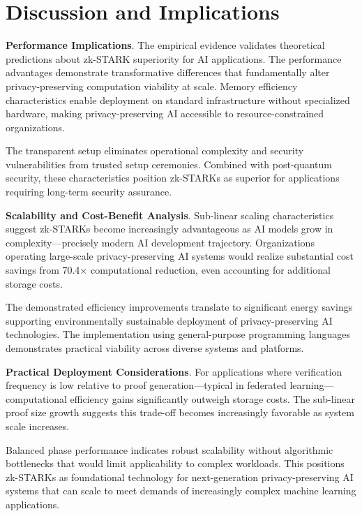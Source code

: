 \documentclass[runningheads]{llncs}
\begin{document}
\section{Discussion and Implications}

{\bf Performance Implications}. The empirical evidence validates theoretical predictions about zk-STARK superiority for AI applications. The performance advantages demonstrate transformative differences that fundamentally alter privacy-preserving computation viability at scale.
Memory efficiency characteristics enable deployment on standard infrastructure without specialized hardware, making privacy-preserving AI accessible to resource-constrained organizations.

The transparent setup eliminates operational complexity and security vulnerabilities from trusted setup ceremonies. Combined with post-quantum security, these characteristics position zk-STARKs as superior for applications requiring long-term security assurance.


{\bf Scalability and Cost-Benefit Analysis}.
Sub-linear scaling characteristics suggest zk-STARKs become increasingly advantageous as AI models grow in complexity—precisely modern AI development trajectory. Organizations operating large-scale privacy-preserving AI systems would realize substantial cost savings from 70.4× computational reduction, even accounting for additional storage costs.

The demonstrated efficiency improvements translate to significant energy savings supporting environmentally sustainable deployment of privacy-preserving AI technologies. The implementation using general-purpose programming languages demonstrates practical viability across diverse systems and platforms.


{\bf Practical Deployment Considerations}.
For applications where verification frequency is low relative to proof generation—typical in federated learning—computational efficiency gains significantly outweigh storage costs. The sub-linear proof size growth suggests this trade-off becomes increasingly favorable as system scale increases.

Balanced phase performance indicates robust scalability without algorithmic bottlenecks that would limit applicability to complex workloads. This positions zk-STARKs as foundational technology for next-generation privacy-preserving AI systems that can scale to meet demands of increasingly complex machine learning applications.


\end{document}
